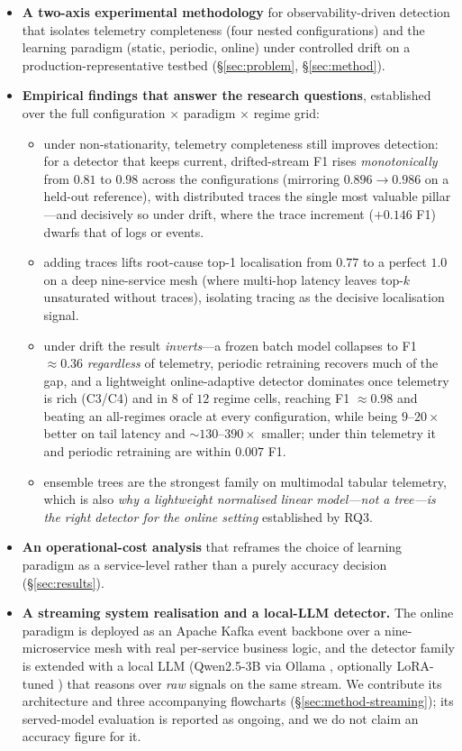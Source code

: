 \documentclass[pdflatex,sn-mathphys-num]{sn-jnl}%
\theoremstyle{thmstyleone}%
\theoremstyle{thmstyletwo}%
\theoremstyle{thmstylethree}%
\begin{document}
\begin{itemize}
  \item \textbf{A two-axis experimental methodology} for observability-driven detection that isolates telemetry completeness (four nested configurations) and the learning paradigm (static, periodic, online) under controlled drift on a production-representative testbed (\S\ref{sec:problem}, \S\ref{sec:method}).
  \item \textbf{Empirical findings that answer the research questions}, established over the full configuration $\times$ paradigm $\times$ regime grid:
  \begin{itemize}
    \item[\emph{To RQ1:}] under non-stationarity, telemetry completeness still improves detection: for a detector that keeps current, drifted-stream F1 rises \emph{monotonically} from $0.81$ to $0.98$ across the configurations (mirroring $0.896 \rightarrow 0.986$ on a held-out reference), with distributed traces the single most valuable pillar---and decisively so under drift, where the trace increment ($+0.146$ F1) dwarfs that of logs or events.
    \item[\emph{To RQ2:}] adding traces lifts root-cause top-1 localisation from $0.77$ to a perfect $1.0$ on a deep nine-service mesh (where multi-hop latency leaves top-$k$ unsaturated without traces), isolating tracing as the decisive localisation signal.
    \item[\emph{To RQ3:}] under drift the result \emph{inverts}---a frozen batch model collapses to F1 $\approx 0.36$ \emph{regardless} of telemetry, periodic retraining recovers much of the gap, and a lightweight online-adaptive detector dominates once telemetry is rich (C3/C4) and in $8$ of $12$ regime cells, reaching F1 $\approx 0.98$ and beating an all-regimes oracle at every configuration, while being $9$--$20\times$ better on tail latency and $\sim 130$--$390\times$ smaller; under thin telemetry it and periodic retraining are within $0.007$ F1.
    \item[\emph{To RQ4:}] ensemble trees are the strongest family on multimodal tabular telemetry, which is also \emph{why a lightweight normalised linear model---not a tree---is the right detector for the online setting} established by RQ3.
  \end{itemize}
  \item \textbf{An operational-cost analysis} that reframes the choice of learning paradigm as a service-level rather than a purely accuracy decision (\S\ref{sec:results}).
  \item \textbf{A streaming system realisation and a local-LLM detector.} The online paradigm is deployed as an Apache Kafka event backbone \cite{kreps2011kafka} over a nine-microservice mesh with real per-service business logic, and the detector family is extended with a local LLM (Qwen2.5-3B \cite{qwen2025} via Ollama \cite{ollama2024}, optionally LoRA-tuned \cite{hu2022lora}) that reasons over \emph{raw} signals on the same stream. We contribute its architecture and three accompanying flowcharts (\S\ref{sec:method-streaming}); its served-model evaluation is reported as ongoing, and we do not claim an accuracy figure for it.

\end{itemize}
\end{document}
